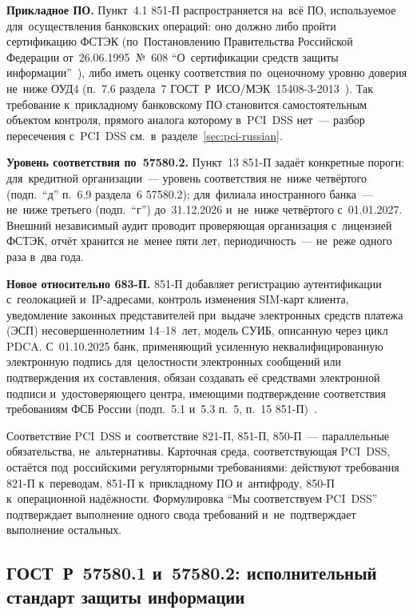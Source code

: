 \textbf{Прикладное ПО.} Пункт~4.1 851-П распространяется на~всё ПО,
используемое для~осуществления банковских операций: оно должно либо пройти
сертификацию ФСТЭК (по~Постановлению Правительства Российской Федерации
  от~26.06.1995~№~608 \enquote{О~сертификации средств защиты
информации}~\cite{pp-608}), либо иметь оценку соответствия по~оценочному уровню
доверия не~ниже ОУД4 (п.~7.6 раздела~7
ГОСТ~Р~ИСО/МЭК~15408-3-2013~\cite{gost-15408-3}). Так требование
к~прикладному банковскому ПО становится самостоятельным объектом контроля,
прямого аналога которому в~PCI~DSS нет~--- разбор пересечения с~PCI~DSS
см.~в~разделе~\ref{sec:pci-russian}.

\textbf{Уровень соответствия по~57580.2.} Пункт~13 851-П задаёт конкретные
пороги: для~кредитной организации~--- уровень соответствия не~ниже четвёртого
(подп.~\enquote{д} п.~6.9 раздела~6 57580.2); для~филиала иностранного
банка~--- не~ниже третьего (подп.~\enquote{г}) до~31.12.2026 и~не~ниже
четвёртого с~01.01.2027. Внешний независимый аудит проводит проверяющая
организация с~лицензией ФСТЭК, отчёт хранится не~менее пяти лет,
периодичность~--- не~реже одного раза в~два года.

\textbf{Новое относительно 683-П.} 851-П добавляет регистрацию аутентификации
с~геолокацией и~IP-адресами, контроль изменения SIM-карт клиента, уведомление
законных представителей при~выдаче электронных средств платежа (ЭСП)
несовершеннолетним 14--18~лет, модель СУИБ, описанную через цикл PDCA.
С~01.10.2025 банк, применяющий усиленную неквалифицированную электронную
подпись для~целостности электронных сообщений или подтверждения их составления,
обязан создавать её средствами электронной подписи и~удостоверяющего центра,
имеющими подтверждение соответствия требованиям ФСБ России (подп.~5.1 и~5.3
п.~5, п.~15 851-П)~\cite{cbr-851p}.

Соответствие PCI~DSS и~соответствие 821-П, 851-П, 850-П~--- параллельные
обязательства, не~альтернативы. Карточная среда, соответствующая PCI~DSS,
остаётся под~российскими регуляторными требованиями: действуют требования 821-П
к~переводам, 851-П к~прикладному ПО и~антифроду, 850-П к~операционной
надёжности. Формулировка \enquote{Мы соответствуем PCI~DSS} подтверждает
выполнение одного свода требований и~не~подтверждает выполнение остальных.

\subsection*{ГОСТ~Р~57580.1 и~57580.2: исполнительный стандарт защиты
информации}\label{sec:regulation-57580}

